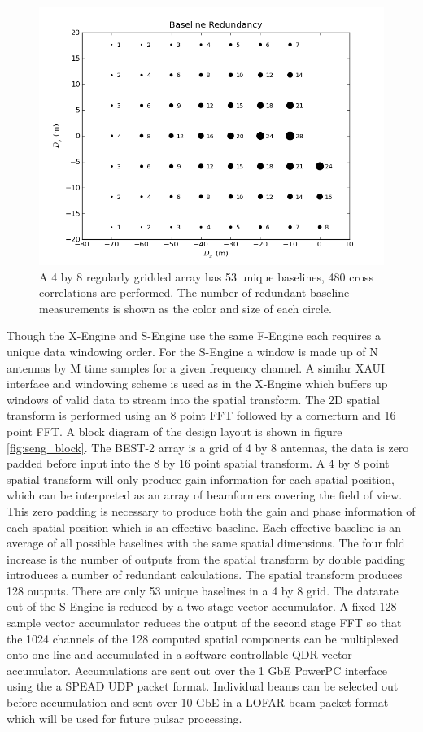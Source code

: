 \documentclass[useAMS,macros,usenatbib,onecolumn]{mn2e}
\begin{document}
\begin{figure}
    \centering
    \includegraphics[scale=0.6]{graphics/redbl.png}
    \caption{A 4 by 8 regularly gridded array has 53 unique baselines, 480 cross correlations are performed. The number of redundant baseline measurements is shown as the color and size of each circle.}
    \label{fig:redbl}
\end{figure}

Though the X-Engine and S-Engine use the same F-Engine each requires a unique data windowing order.
For the S-Engine a window is made up of N antennas by M time samples for a given frequency channel.
A similar XAUI interface and windowing scheme is used as in the X-Engine which buffers up windows of valid data to stream into the spatial transform.
The 2D spatial transform is performed using an 8 point FFT followed by a cornerturn and 16 point FFT.
A block diagram of the design layout is shown in figure \ref{fig:seng_block}.
The BEST-2 array is a grid of 4 by 8 antennas, the data is zero padded before input into the 8 by 16 point spatial transform.
A 4 by 8 point spatial transform will only produce gain information for each spatial position, which can be interpreted as an array of beamformers covering the field of view.
This zero padding is necessary to produce both the gain and phase information of each spatial position which is an effective baseline.
Each effective baseline is an average of all possible baselines with the same spatial dimensions.
The four fold increase is the number of outputs from the spatial transform by double padding introduces a number of redundant calculations.
The spatial transform produces 128 outputs.
There are only 53 unique baselines in a 4 by 8 grid.
The datarate out of the S-Engine is reduced by a two stage vector accumulator.
A fixed 128 sample vector accumulator reduces the output of the second stage FFT so that the 1024 channels of the 128 computed spatial components can be multiplexed onto one line and accumulated in a software controllable QDR vector accumulator.
Accumulations are sent out over the 1 GbE PowerPC interface using the a SPEAD UDP packet format.
Individual beams can be selected out before accumulation and sent over 10 GbE in a LOFAR beam packet format which will be used for future pulsar processing.
\end{document}
